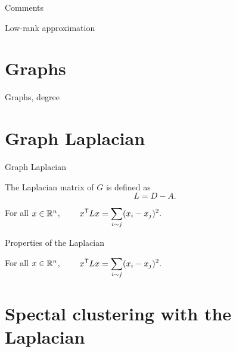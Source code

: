 \documentclass{beamer}
\begin{document}
\begin{frame}[t]{Comments}
	\grid

\end{frame}

\begin{frame}[t]{Low-rank approximation}
	\grid

\end{frame}

\section{Graphs}

\begin{frame}[t]{Graphs, degree}
	\grid

\end{frame}

\section{Graph Laplacian}

\begin{frame}[t]{Graph Laplacian}
	\grid

	\vspace{-0.4cm}
	\begin{definition}
		The Laplacian matrix of $G$ is defined as
		$$
		L = D - A.
		$$
	\end{definition}

	\pause
	\vspace{-0.4cm}
	\begin{exampleblock}{}
		For all $x \in \mathbb{R}^n$,
		$\displaystyle \qquad
		x^{\sT} L x = \sum_{i \sim j} (x_i - x_j)^2.
		\vspace{-0.1cm}
		$
	\end{exampleblock}
\end{frame}


\begin{frame}[t]{Properties of the Laplacian}
	\grid

	\vspace{-0.8cm}
	\begin{exampleblock}{}
		For all $x \in \mathbb{R}^n$,
		$\displaystyle \qquad
		x^{{\sf T}} L x = \sum_{i \sim j} (x_i - x_j)^2.
		$
	\end{exampleblock}


	\pause
	\pause
\end{frame}

\section{Spectal clustering with the Laplacian}
\end{document}
